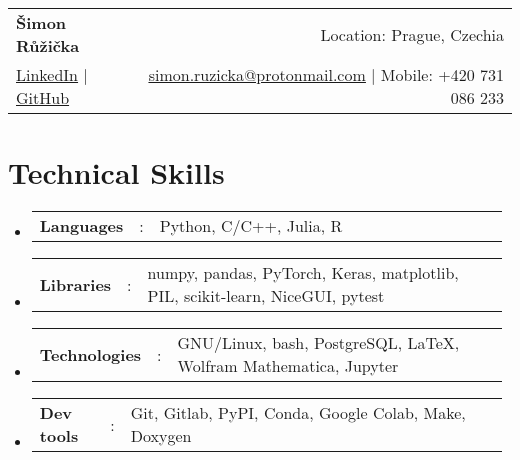 \documentclass[a4paper,11pt]{article}
\newcommand{\resumeSectionType}[3]{
  \item\begin{tabular*}{0.96\textwidth}[t]{
    p{0.15\linewidth}p{0.02\linewidth}p{0.81\linewidth}
  }
    \textbf{#1} & #2 & #3
  \end{tabular*}\vspace{-2pt}
}
\newcommand{\resumeHeadingListStart}{
  \begin{itemize}[leftmargin=0.15in, label={}]
}
\newcommand{\resumeHeadingListEnd}{\end{itemize}}
\begin{document}

\begin{tabular*}{\textwidth}{l@{\extracolsep{\fill}}r}
  \textbf{\Huge Šimon Růžička \vspace{2pt}} & %
  Location: Prague, Czechia \\ %
  \href{https://www.linkedin.com/in/šimon-růžička-6379711b2/}{\uline{LinkedIn}} $|$ %
  \href{https://github.com/ruzicka02}{\uline{GitHub}} %
  &
  \href{mailto:simon.ruzicka@protonmail.com}{\uline{simon.ruzicka@protonmail.com}} $|$ %
  Mobile: +420 731 086 233 %
\end{tabular*}






\section{Technical Skills}
  \resumeHeadingListStart{}
    \resumeSectionType{Languages}{:}{
      Python, C/C++, Julia, R %
    }
    \resumeSectionType{Libraries}{:}{
      numpy, pandas, PyTorch, Keras, matplotlib, PIL, scikit-learn, NiceGUI, pytest
    }
    \resumeSectionType{Technologies}{:}{
      GNU/Linux, bash, PostgreSQL, \LaTeX, Wolfram Mathematica, Jupyter %
    }
    \resumeSectionType{Dev tools}{:}{
      Git, Gitlab, PyPI, Conda, Google Colab, Make, Doxygen
    }
  \resumeHeadingListEnd{}
\end{document}
